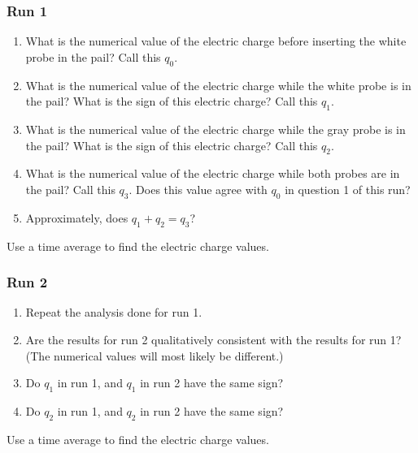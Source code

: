 \subsubsection{Run 1}
\begin{enumerate}
	\item What is the numerical value of the electric charge before inserting the white probe in the pail? Call this $q_{0}$.
	\item What is the numerical value of the electric charge while the white probe is in the pail? What is the sign of this electric charge? Call this $q_{1}$.
	\item What is the numerical value of the electric charge while the gray probe is in the pail? What is the sign of this electric charge? Call this $q_{2}$.
	\item What is the numerical value of the electric charge while both probes are in the pail? Call this $q_{3}$. Does this value agree with $q_{0}$ in question 1 of this run?
	\item Approximately, does $q_{1} + q_{2} = q_{3}$?
\end{enumerate}
Use a time average to find the electric charge values.
\subsubsection{Run 2}
\begin{enumerate}
	\item Repeat the analysis done for run 1.
	\item Are the results for run 2 qualitatively consistent with the results for run 1? (The numerical values will most likely be different.)
	\item Do $q_{1}$ in run 1, and $q_{1}$ in run 2 have the same sign?
	\item Do $q_{2}$ in run 1, and $q_{2}$ in run 2 have the same sign?
\end{enumerate}
Use a time average to find the electric charge values.
